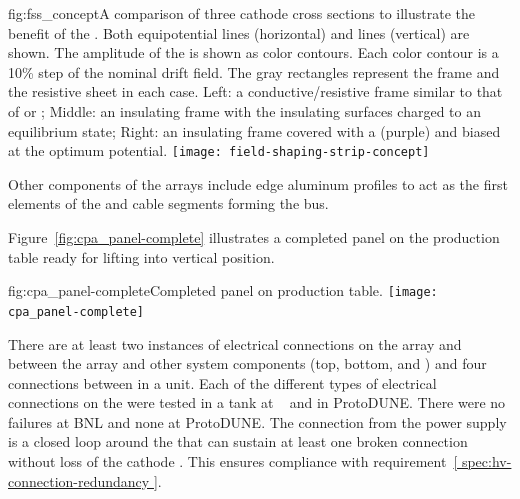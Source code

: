 \begin{dunefigure}{fig:fss_concept}{A comparison of three cathode cross sections to illustrate the benefit of the . Both equipotential lines (horizontal) and \efield{} lines (vertical) are shown.  The amplitude of the \efield{} is shown as color contours. Each color contour is a 10\% step of the nominal drift field.  The gray rectangles represent the frame and the resistive sheet in each case. Left: a conductive/resistive frame similar to that of  or ; Middle: an insulating frame with the insulating surfaces charged to an equilibrium state; Right: an insulating frame covered with a  (purple) and biased at the optimum potential. }
\texttt{[image: field-shaping-strip-concept]} %
\end{dunefigure}

Other  components of the  arrays include  edge aluminum profiles to act as the first elements of the  and cable segments forming the  bus.

Figure~\ref{fig:cpa_panel-complete} illustrates a completed   panel on the production table ready for lifting into vertical position. %

\begin{dunefigure}{fig:cpa_panel-complete}{Completed   panel on production table.}
\texttt{[image: cpa\_panel-complete]}
\end{dunefigure}

There are at least two instances of electrical connections on the  array and between the  array and other  system components (top, bottom, and ) and four connections between  in a  unit.  Each of the different types of electrical connections on the  were tested in a  tank at ~\cite{bib:docdb2338}  and in ProtoDUNE. There were no failures at BNL and none at ProtoDUNE.  The  connection from the  power supply is a closed loop around the  that can sustain at least one broken connection without loss of the cathode .  This ensures compliance with requirement~\ref{ spec:hv-connection-redundancy }.


